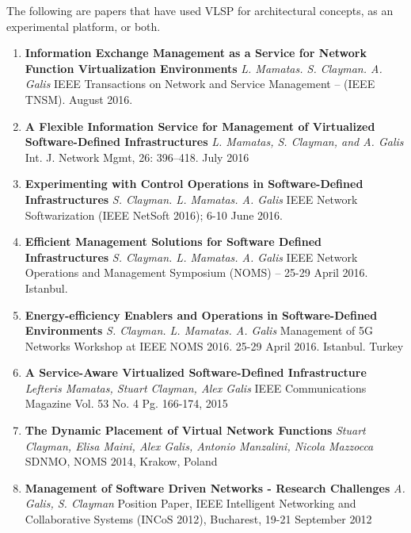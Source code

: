 The following are papers that have used VLSP for architectural
concepts, as an experimental platform, or both.

\begin{enumerate}
\item

\textbf{Information Exchange Management as a Service for Network Function Virtualization Environments}
\emph{L. Mamatas. S. Clayman. A. Galis}
IEEE Transactions on Network and Service Management – (IEEE TNSM). August 2016.

  \item
\textbf{A Flexible Information Service for Management of Virtualized Software-Defined Infrastructures}
\emph{L. Mamatas, S. Clayman, and A. Galis}
Int. J. Network Mgmt, 26: 396–418. July 2016

  \item
\textbf{Experimenting with Control Operations in Software-Defined Infrastructures}
\emph{S. Clayman. L. Mamatas. A. Galis}
IEEE Network Softwarization (IEEE NetSoft 2016); 6-10 June 2016. 

  \item
\textbf{Efficient Management Solutions for Software Defined Infrastructures}
\emph{S. Clayman. L. Mamatas. A. Galis}
IEEE Network Operations and Management Symposium (NOMS) – 25-29 April 2016. Istanbul.

  \item
\textbf{Energy-efficiency Enablers and Operations in Software-Defined Environments}
\emph{S. Clayman. L. Mamatas. A. Galis}
Management of 5G Networks Workshop at IEEE NOMS 2016. 25-29 April 2016. Istanbul. Turkey

  \item
\textbf{A Service-Aware Virtualized Software-Defined Infrastructure}
\emph{Lefteris Mamatas, Stuart Clayman, Alex Galis}
IEEE Communications Magazine Vol. 53 No. 4 Pg. 166-174, 2015

  \item
\textbf{The Dynamic Placement of Virtual Network Functions}
\emph{Stuart Clayman, Elisa Maini, Alex Galis, Antonio Manzalini, Nicola Mazzocca}
SDNMO, NOMS 2014, Krakow, Poland



  \item
\textbf{Management of Software Driven Networks - Research Challenges}
\emph{A. Galis, S. Clayman}
Position Paper, IEEE Intelligent Networking and Collaborative Systems (INCoS 2012), Bucharest, 19-21 September 2012


\end{enumerate}
